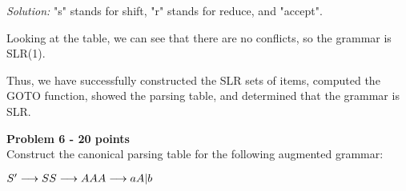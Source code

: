 \documentclass[a4paper, 11pt]{article}
\newenvironment{problem}[2][Problem]
    { \begin{mdframed}[backgroundcolor=gray!20] \textbf{#1 #2} \\}
    {  \end{mdframed}}
\newenvironment{solution}
    {\textit{Solution:}}
    {}
\begin{document}
\begin{solution}
\noindent "s" stands for shift, "r" stands for reduce, and "accept".

\noindent Looking at the table, we can see that there are no conflicts, so the grammar is SLR(1).

\noindent Thus, we have successfully constructed the SLR sets of items, computed the GOTO function, showed the parsing table, and determined that the grammar is SLR.
\end{solution} 


\begin{problem}{6 - 20 points}
Construct the canonical parsing table for the following augmented grammar:

\noindent $S'  \longrightarrow S \\
S \longrightarrow AA \\ 
A \longrightarrow a A | b $\\

\end{problem}
\end{document}
